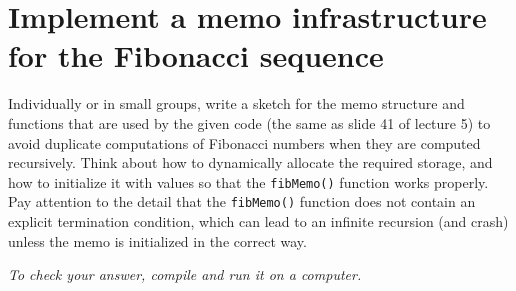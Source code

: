\documentclass[a4paper]{article}
\begin{document}
\section{Implement a memo infrastructure for the Fibonacci sequence}

Individually or in small groups, write a sketch for the memo structure and functions that are used by the given code (the same as slide 41 of lecture 5) to avoid duplicate computations of Fibonacci numbers when they are computed recursively.
Think about how to dynamically allocate the required storage, and how to initialize it with values so that the \texttt{fibMemo()} function works properly.
Pay attention to the detail that the \texttt{fibMemo()} function does not contain an explicit termination condition, which can lead to an infinite recursion (and crash) unless the memo is initialized in the correct way.

\emph{
  To check your answer, compile and run it on a computer.
}
\end{document}
